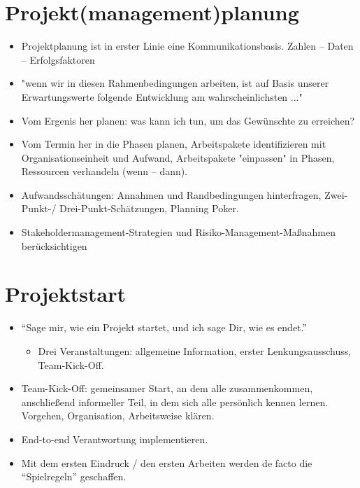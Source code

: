 \documentclass[a4paper]{article}
\begin{document}
\section{Projekt(management)planung}
\begin{itemize}
  \item Projektplanung ist in erster Linie eine Kommunikationsbasis. Zahlen -- Daten -- Erfolgsfaktoren
  \item "wenn wir in diesen Rahmenbedingungen arbeiten, ist auf Basis unserer Erwartungswerte folgende Entwicklung am wahrscheinlichsten ..."
  \item Vom Ergenis her planen: was kann ich tun, um das Gewünschte zu erreichen?
  \item Vom Termin her in die Phasen planen, Arbeitspakete identifizieren mit Organisationseinheit und Aufwand, Arbeitspakete "einpassen" in Phasen, Ressourcen verhandeln (wenn -- dann).
  \item Aufwandsschätungen: Annahmen und Randbedingungen hinterfragen, Zwei-Punkt-/ Drei-Punkt-Schätzungen, Planning Poker.
  \item Stakeholdermanagement-Strategien und Risiko-Management-Maßnahmen berücksichtigen
\end{itemize}

\section{Projektstart}
\begin{itemize}
  \item ``Sage mir, wie ein Projekt startet, und ich sage Dir, wie es endet.''
    \begin{itemize}
      \item Drei Veranstaltungen: allgemeine Information, erster Lenkungsausschuss, Team-Kick-Off.
    \end{itemize}
  \item Team-Kick-Off: gemeinsamer Start, an dem alle zusammenkommen, anschließend informeller Teil, in dem sich alle persönlich kennen lernen. Vorgehen, Organisation, Arbeitsweise klären.
  \item End-to-end Verantwortung implementieren.
  \item Mit dem ersten Eindruck / den ersten Arbeiten werden de facto die ``Spielregeln'' geschaffen.
\end{itemize}
\end{document}
